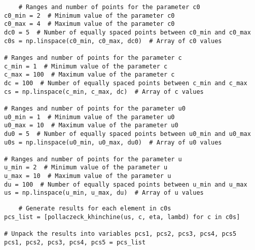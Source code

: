\documentclass[12pt,letterpaper]{article}
\theoremstyle{definition}
\begin{document}
\begin{lstlisting}
    # Ranges and number of points for the parameter c0
c0_min = 2  # Minimum value of the parameter c0
c0_max = 4  # Maximum value of the parameter c0
dc0 = 5  # Number of equally spaced points between c0_min and c0_max
c0s = np.linspace(c0_min, c0_max, dc0)  # Array of c0 values

# Ranges and number of points for the parameter c
c_min = 1  # Minimum value of the parameter c
c_max = 100  # Maximum value of the parameter c
dc = 100  # Number of equally spaced points between c_min and c_max
cs = np.linspace(c_min, c_max, dc)  # Array of c values

# Ranges and number of points for the parameter u0
u0_min = 1  # Minimum value of the parameter u0
u0_max = 10  # Maximum value of the parameter u0
du0 = 5  # Number of equally spaced points between u0_min and u0_max
u0s = np.linspace(u0_min, u0_max, du0)  # Array of u0 values

# Ranges and number of points for the parameter u
u_min = 2  # Minimum value of the parameter u
u_max = 10  # Maximum value of the parameter u
du = 100  # Number of equally spaced points between u_min and u_max
us = np.linspace(u_min, u_max, du)  # Array of u values
\end{lstlisting}
\begin{lstlisting}
    # Generate results for each element in c0s
pcs_list = [pollaczeck_khinchine(us, c, eta, lambd) for c in c0s]

# Unpack the results into variables pcs1, pcs2, pcs3, pcs4, pcs5
pcs1, pcs2, pcs3, pcs4, pcs5 = pcs_list

\end{lstlisting}
\end{document}
